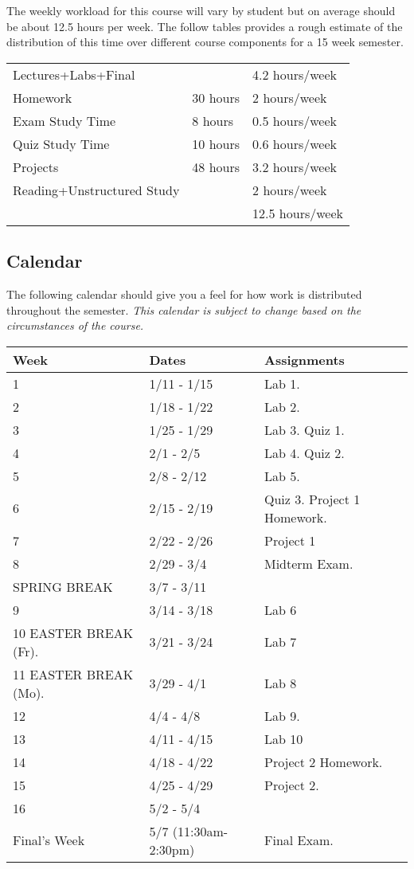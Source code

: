 \documentclass[10pt]{article}
\begin{document}
The weekly workload for this course will vary by student but on average should be about 12.5 hours per week.  The follow tables provides a rough estimate of the distribution of this time over different course components for a 15 week semester. 
\begin{center}
\begin{tabular}{|l|l|l|}
\hline
Lectures+Labs+Final &      & 4.2 hours/week \\ 
Homework & 30 hours        & 2 hours/week \\
Exam Study Time & 8 hours  & 0.5 hours/week \\ 
Quiz Study Time & 10 hours & 0.6 hours/week \\
Projects & 48 hours        & 3.2 hours/week \\
Reading+Unstructured Study & & 2 hours/week \\
\hline 
& & 12.5 hours/week \\ 
\hline
\end{tabular}
\end{center}

\subsection{Calendar}

The following calendar should give you a feel for how work is distributed throughout the semester.  \textit{This calendar is subject to change based on the circumstances of the course.}

\begin{center}
\begin{tabular}{|l|l|l|}
\hline 
Week & Dates & Assignments \\
\hline
1 & 1/11 - 1/15 &  Lab 1.  \\
\hline
2 & 1/18 - 1/22 & Lab 2.  \\
\hline
3 & 1/25 - 1/29 & Lab 3. Quiz 1. \\
\hline
4 & 2/1 - 2/5 & Lab 4. Quiz 2.\\
\hline
5 & 2/8 - 2/12 & Lab 5.  \\
\hline
6 & 2/15 - 2/19 & Quiz 3. Project 1 Homework. \\
\hline
7 & 2/22 - 2/26 & Project 1   \\
\hline
8 & 2/29 - 3/4 & Midterm Exam. \\
\hline 
SPRING BREAK & 3/7 - 3/11 & \\
\hline
9 & 3/14 - 3/18 & Lab 6 \\
\hline
10 EASTER BREAK (Fr). & 3/21 - 3/24 & Lab 7  \\
\hline
11 EASTER BREAK (Mo). & 3/29 - 4/1 & Lab 8  \\
\hline
12 & 4/4 - 4/8 & Lab 9.  \\
\hline
13 & 4/11 - 4/15 & Lab 10   \\
\hline
14 & 4/18 - 4/22 & Project 2 Homework.  \\
\hline
15 & 4/25 - 4/29 & Project 2.  \\ 
\hline
16 & 5/2 - 5/4 &   \\
\hline
Final's Week & 5/7 (11:30am-2:30pm) & Final Exam.   \\ 
\hline
\end{tabular}
\end{center}
\end{document}
